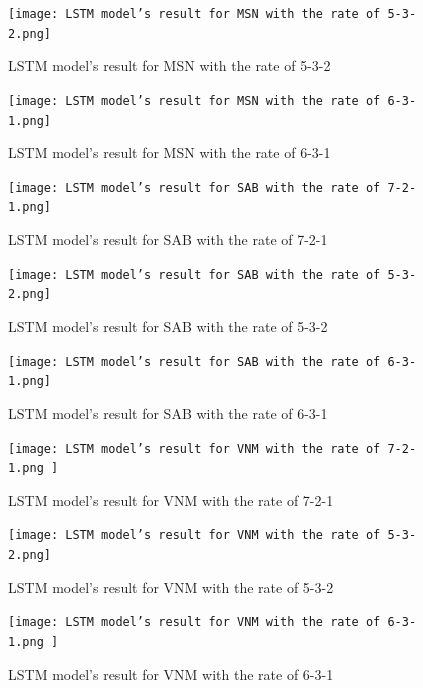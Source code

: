 \documentclass{ieeeojies}
\begin{document}
    \begin{figure}[H]

    \begin{minipage}{0.23\textwidth}
    \centering
    \texttt{[image: LSTM model’s result for MSN with the rate of 5-3-2.png]}
    \caption{LSTM model’s result for MSN with the rate of 5-3-2}
    \end{minipage}
    \hfill
    \begin{minipage}{0.23\textwidth}
    \centering
    \texttt{[image: LSTM model’s result for MSN with the rate of 6-3-1.png]}
    \caption{LSTM model’s result for MSN with the rate of 6-3-1}
    \end{minipage}
    \end{figure}
    \begin{figure}[H]
    \begin{minipage}{0.23\textwidth}
    \centering
    \texttt{[image: LSTM model’s result for SAB with the rate of 7-2-1.png]}
    \caption{LSTM model’s result for SAB with the rate of 7-2-1}
    \end{minipage}
    \hfill
    \begin{minipage}{0.23\textwidth}
    \centering
    \texttt{[image: LSTM model’s result for SAB with the rate of 5-3-2.png]}
    \caption{LSTM model’s result for SAB with the rate of 5-3-2}
    \end{minipage}
    \end{figure}
    
    \begin{figure}[H]
    \begin{minipage}{0.23\textwidth}
    \centering
    \texttt{[image: LSTM model’s result for SAB with the rate of 6-3-1.png]}
    \caption{LSTM model’s result for SAB with the rate of 6-3-1}
    \end{minipage}
    \hfill
    \begin{minipage}{0.23\textwidth}
    \centering
    \texttt{[image: LSTM model’s result for VNM with the rate of 7-2-1.png ]}
    \caption{LSTM model’s result for VNM with the rate of 7-2-1}
    \end{minipage}
    \end{figure}

    \begin{figure}[H]
    \begin{minipage}{0.23\textwidth}
    \centering
    \texttt{[image: LSTM model’s result for VNM with the rate of 5-3-2.png]}
    \caption{LSTM model’s result for VNM with the rate of 5-3-2}
    \end{minipage}
    \hfill
    \begin{minipage}{0.23\textwidth}
    \centering
    \texttt{[image: LSTM model’s result for VNM with the rate of 6-3-1.png ]}
    \caption{LSTM model’s result for VNM with the rate of 6-3-1}
    \end{minipage}
    \end{figure}
   
\end{document}
